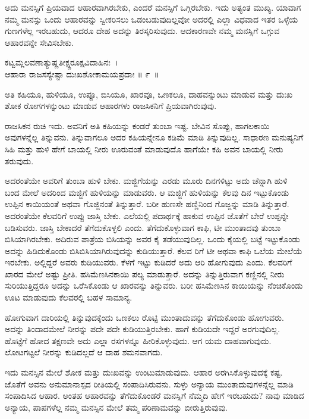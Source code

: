 ಅದು ಮನಸ್ಸಿಗೆ ಪ್ರಿಯವಾದ ಆಹಾರವಾಗಿರಬೇಕು, ಎಂದರೆ ಮನಸ್ಸಿಗೆ ಒಗ್ಗಿರಬೇಕು. ಇದು ಅತ್ಯಂತ ಮುಖ್ಯ. ಯಾವಾಗ ನಮ್ಮ ಮನಸ್ಸು ಒಂದು ಆಹಾರವನ್ನು ಸ್ವೀಕರಿಸಲು ಒಡಂಬಡುವುದಿಲ್ಲವೋ ಅದರಲ್ಲಿ ಎಲ್ಲಾ ವಿಧವಾದ ಇತರ ಒಳ್ಳೆಯ ಗುಣಗಳೆಲ್ಲ ಇರಬಹುದು, ಆದರೂ ದೇಹ ಅದನ್ನು ತಿರಸ್ಕರಿಸುವುದು. ಆದಕಾರಣವೇ ನಮ್ಮ ಮನಸ್ಸಿಗೆ ಒಗ್ಗುವ ಆಹಾರವನ್ನೇ ಸೇವಿಸಬೇಕು.

\begin{shloka}
ಕಟ್ವಮ್ಲಲವಣಾತ್ಯುಷ್ಣತೀಕ್ಷ್ಣರೂಕ್ಷವಿದಾಹಿನಃ~।\\ಆಹಾರಾ ರಾಜಸಸ್ಯೇಷ್ಟಾ ದುಃಖಶೋಕಾಮಯಪ್ರದಾಃ \hfill॥ ೯~॥
\end{shloka}

\begin{artha}
ಅತಿ ಕಹಿಯೂ, ಹುಳಿಯೂ, ಉಪ್ಪೂ, ಬಿಸಿಯೂ, ಖಾರವೂ, ಒಣಕಲೂ, ದಾಹವನ್ನುಂಟು ಮಾಡುವ ಮತ್ತು ದುಃಖ ಶೋಕ ರೋಗಗಳನ್ನುಂಟು ಮಾಡುವ ಆಹಾರಗಳು ರಾಜಸಿಕನಿಗೆ ಪ್ರಿಯವಾಗಿರುವುವು.
\end{artha}

ರಾಜಸಿಕನ ರುಚಿ ಇದು. ಅವನಿಗೆ ಅತಿ ಕಹಿಯನ್ನು ಕಂಡರೆ ತುಂಬಾ ಇಷ್ಟ. ಬೇವಿನ ಸೊಪ್ಪು, ಹಾಗಲಕಾಯಿ ಅವುಗಳನ್ನೆಲ್ಲ ತಿನ್ನುವನು. ತಿನ್ನುವಾಗಲೂ ಅದರ ಕಹಿಯನ್ನೇನೂ ಕಡಿಮೆ ಮಾಡಿ ತಿನ್ನುವುದಿಲ್ಲ. ಸಾಧಾರಣ ಮನುಷ್ಯನಿಗೆ ಸಿಹಿ ಮತ್ತು ಹುಳಿ ಹೇಗೆ ಬಾಯಲ್ಲಿ ನೀರು ಊರುವಂತೆ ಮಾಡುವುದೊ ಹಾಗೆಯೇ ಕಹಿ ಅವನ ಬಾಯಲ್ಲಿ ನೀರು ತರುವುದು.

ಅದರಂತೆಯೇ ಅವರಿಗೆ ತುಂಬಾ ಹುಳಿ ಬೇಕು. ಮಜ್ಜಿಗೆಯನ್ನು ಎರಡು ಮೂರು ದಿನಗಳಿಟ್ಟು ಅದು ಚೆನ್ನಾಗಿ ಹುಳಿ ಬಂದ ಮೇಲೆ ಅದರಿಂದ ಮಜ್ಜಿಗೆ ಹುಳಿಯನ್ನು ಮಾಡುವರು. ಆ ಮಜ್ಜಿಗೆ ಹುಳಿಯನ್ನು ಕೆಲವು ದಿನ ಇಟ್ಟುಕೊಂಡು ಉಪ್ಪಿನ ಕಾಯಿಯಂತೆ ಅಥವಾ ಗೊಜ್ಜಿನಂತೆ ತಿನ್ನುತ್ತಾರೆ. ಬರೀ ಹುಣಸೇ ಹಣ್ಣಿನಿಂದ ಗೊಜ್ಜನ್ನು ಮಾಡಿ ತಿನ್ನುತ್ತಾರೆ. ಅದರಂತೆಯೇ ಕೆಲವರಿಗೆ ಉಪ್ಪು ಜಾಸ್ತಿ ಬೇಕು. ಎಲೆಯಲ್ಲಿ ಪದಾರ್ಥಕ್ಕೆ ಹಾಕುವ ಉಪ್ಪಿನ ಜೊತೆಗೆ ಬೇರೆ ಉಪ್ಪನ್ನೇ ಬಡಿಸುವರು. ಜಾಸ್ತಿ ಬೇಕಾದರೆ ತೆಗೆದುಕೊಳ್ಳಲಿ ಎಂದು. ತೆಗೆದುಕೊಳ್ಳುವಾಗ ಕಾಫಿ, ಟೀ ಮುಂತಾದವು ತುಂಬಾ ಬಿಸಿಯಾಗಿರಬೇಕು. ಅದಿರುವ ಪಾತ್ರೆಯ ಬಿಸಿಯನ್ನು ಅವರ ಕೈ ತಡೆಯುವುದಿಲ್ಲ. ಒಂದು ಕೈಯಲ್ಲಿ ಬಟ್ಟೆ ಇಟ್ಟುಕೊಂಡು ಅದನ್ನು ಹಿಡಿದುಕೊಂಡು ಬಿಸಿಬಿಸಿಯಾಗಿರುವುದನ್ನು ಕುಡಿಯುತ್ತಾರೆ. ಕೆಲವ ರಿಗೆ ಟೀ ಅಥವಾ ಕಾಫಿ ಒಲೆಯ ಮೇಲೆಯೆ ಇರಬೇಕು. ಅಲ್ಲಿದ್ದರೆ ಅವರು ಕುಡಿಯುವರು. ಕೆಳಗೆ ಇಟ್ಟು ಕುಡಿದರೆ ಅದು ಆರಿ ಹೋಗುವುದು ಎಂದು. ಕೆಲವರಿಗೆ ಖಾರದ ಮೇಲೆ ಅಷ್ಟು ಪ್ರೀತಿ. ಹಸಿಮೆಣಸಿನಕಾಯಿ ಪಲ್ಯ ಮಾಡುತ್ತಾರೆ. ಅದನ್ನು ತಿನ್ನುತ್ತಿರುವಾಗ ಕಣ್ಣಿನಲ್ಲಿ ನೀರು ಸುರಿಯುತ್ತಿದ್ದರೂ ಅದನ್ನು ಒರೆಸಿಕೊಂಡು ಆ ಖಾರವನ್ನು ತಿನ್ನುವರು. ಬರೀ ಹಸಿಮೆಣಸಿನ ಕಾಯಿಯನ್ನು ನೆಂಚಿಕೊಂಡು ಊಟ ಮಾಡುವುದು ಕೆಲವರಲ್ಲಿ ಬಹಳ ಸಾಮಾನ್ಯ.

ಹೋಗುವಾಗ ದಾರಿಯಲ್ಲಿ ತಿನ್ನುವುದಕ್ಕೆಂದು ಒಣಕಲು ರೊಟ್ಟಿ ಮುಂತಾದುವನ್ನು ತೆಗೆದುಕೊಂಡು ಹೋಗುವರು. ಅದನ್ನು ತಿಂದಾದಮೇಲೆ ನೀರನ್ನು ಪದೇ ಪದೇ ಕುಡಿಯುತ್ತಿರಬೇಕು. ಹಾಗೆ ಕುಡಿಯದೇ ಇದ್ದರೆ ಅರಗುವುದಿಲ್ಲ. ಹೊಟ್ಟೆಗೆ ಹೋದ ತಕ್ಷಣವೇ ಅದು ಎಲ್ಲಾ ರಸಗಳನ್ನೂ ಹೀರಿಕೊಳ್ಳುವುದು. ಆಗ ಯಮ ದಾಹವಾಗುವುದು. ಲೋಟಗಟ್ಟಲೆ ನೀರನ್ನು ಕುಡಿದಲ್ಲದೆ ಆ ದಾಹ ಶಮನವಾಗದು.

ಇದು ಮನಸ್ಸಿನ ಮೇಲೆ ಶೋಕ ಮತ್ತು ದುಃಖವನ್ನು ಉಂಟುಮಾಡುವುದು. ಆಹಾರ ಅರಗಿಸಿಕೊಳ್ಳುವುದಕ್ಕೆ ಕಷ್ಟ. ಜೊತೆಗೆ ಅವನು ಅನುಮಾನಾಸ್ಪದ ರೀತಿಯಲ್ಲಿ ಸಂಪಾದಿಸಿರುವನು. ಸುಳ್ಳು ಅನ್ಯಾಯ ಮುಂತಾದುವುಗಳನ್ನೆಲ್ಲ ಮಾಡಿ ಸಂಪಾದಿಸಿದ ಆಹಾರ. ಅಂತಹ ಆಹಾರವನ್ನು ತೆಗೆದುಕೊಂಡರೆ ಮನಸ್ಸಿಗೆ ನೆಮ್ಮದಿ ಹೇಗೆ ಇರಬಹುದು? ನಾವು ಮಾಡಿದ ಅನ್ಯಾಯ, ಪಾಪಗಳೆಲ್ಲ ನಮ್ಮ ಮನಸ್ಸಿನ ಮೇಲೆ ತಮ್ಮ ಪರಿಣಾಮವನ್ನು ಬೀರುತ್ತಿರುವುವು.

